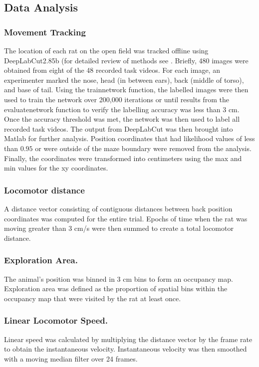 \documentclass[fleqn,10pt]{wlscirep}
\begin{document}
\subsection*{Data Analysis}
\subsubsection*{Movement Tracking}The location of each rat on the open field was tracked offline using DeepLabCut2.85b (for detailed review of methods see \cite{mathis_deeplabcut_2018}. Briefly, 480 images were obtained from eight of the 48 recorded task videos. For each image, an experimenter marked the nose, head (in between ears), back (middle of torso), and base of tail. Using the trainnetwork function, the labelled images were then used to train the network over 200,000 iterations or until results from the evaluatenetwork function to verify the labelling accuracy was less than 3 cm. Once the accuracy threshold was met, the network was then used to label all recorded task videos. The output from DeepLabCut was then brought into Matlab for further analysis. Position coordinates that had likelihood values of less than $0.95$ or were outside of the maze boundary were removed from the analysis. Finally, the coordinates were transformed into centimeters using the max and min values for the xy coordinates.

\subsubsection*{Locomotor distance} A distance vector consisting of contiguous distances between back position coordinates was computed for the entire trial. Epochs of time when the rat was moving greater than 3 cm/s were then summed to create a total locomotor distance.  

\subsubsection*{Exploration Area.} The animal's position was binned in 3 cm bins to form an occupancy map. Exploration area was defined as the proportion of spatial bins within the occupancy map that were visited by the rat at least once. 

\subsubsection*{Linear Locomotor Speed.} Linear speed was calculated by multiplying the distance vector by the frame rate to obtain the instantaneous velocity. Instantaneous velocity was then smoothed with a moving median filter over 24 frames. 
\end{document}
